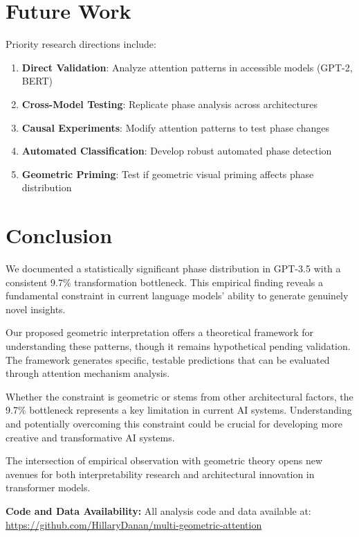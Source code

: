 \documentclass[mlmain]{jmlr}
\begin{document}
\section{Future Work}

Priority research directions include:

\begin{enumerate}
\item \textbf{Direct Validation}: Analyze attention patterns in accessible models (GPT-2, BERT)
\item \textbf{Cross-Model Testing}: Replicate phase analysis across architectures
\item \textbf{Causal Experiments}: Modify attention patterns to test phase changes
\item \textbf{Automated Classification}: Develop robust automated phase detection
\item \textbf{Geometric Priming}: Test if geometric visual priming affects phase distribution
\end{enumerate}

\section{Conclusion}

We documented a statistically significant phase distribution in GPT-3.5 with a consistent 9.7\% transformation bottleneck. This empirical finding reveals a fundamental constraint in current language models' ability to generate genuinely novel insights.

Our proposed geometric interpretation offers a theoretical framework for understanding these patterns, though it remains hypothetical pending validation. The framework generates specific, testable predictions that can be evaluated through attention mechanism analysis.

Whether the constraint is geometric or stems from other architectural factors, the 9.7\% bottleneck represents a key limitation in current AI systems. Understanding and potentially overcoming this constraint could be crucial for developing more creative and transformative AI systems.

The intersection of empirical observation with geometric theory opens new avenues for both interpretability research and architectural innovation in transformer models.


\textbf{Code and Data Availability:} All analysis code and data available at: \url{https://github.com/HillaryDanan/multi-geometric-attention}


\end{document}
